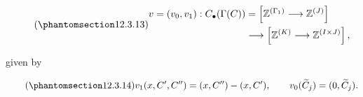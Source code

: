 \begin{equation}\tag{\SGARefTarget{sga7.sga7i.eix.n12-3-13}{12.3.13}}
 \begin{split}
 v=(v_0,v_1):C_\bullet(\Gamma(C))
   &=\left[\mathbb Z^{(\Gamma_1)}\longrightarrow\mathbb Z^{(J)}\right]\\
   &\longrightarrow
     \left[\mathbb Z^{(K)}\longrightarrow\mathbb Z^{(I\times J)}\right],
 \end{split}
\end{equation}

\noindent
given by

\begin{equation}\tag{\SGARefTarget{sga7.sga7i.eix.n12-3-14}{12.3.14}}
 v_1(x,C',C'')=(x,C'')-(x,C'),
 \qquad
 v_0(\widetilde C_j)=(0,\widetilde C_j).
\end{equation}
